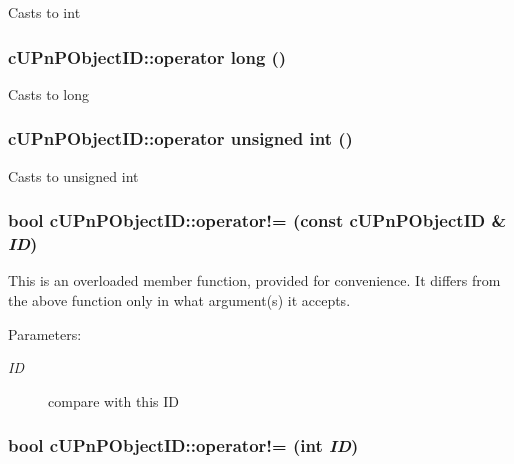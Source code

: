 Casts to int \hypertarget{structcUPnPObjectID_d5659a7a9f7cfc7dd6ae0911ebd5e03c}{
\subsubsection[{operator long}]{\setlength{\rightskip}{0pt plus 5cm}cUPnPObjectID::operator long ()}}
\label{structcUPnPObjectID_d5659a7a9f7cfc7dd6ae0911ebd5e03c}


Casts to long \hypertarget{structcUPnPObjectID_daa4eae524c68f1f85b8d82d16568d10}{
\subsubsection[{operator unsigned int}]{\setlength{\rightskip}{0pt plus 5cm}cUPnPObjectID::operator unsigned int ()}}
\label{structcUPnPObjectID_daa4eae524c68f1f85b8d82d16568d10}


Casts to unsigned int \hypertarget{structcUPnPObjectID_d55b5dc94c58d56762c602de5dd99790}{
\subsubsection[{operator!=}]{\setlength{\rightskip}{0pt plus 5cm}bool cUPnPObjectID::operator!= (const {\bf cUPnPObjectID} \& {\em ID})}}
\label{structcUPnPObjectID_d55b5dc94c58d56762c602de5dd99790}


This is an overloaded member function, provided for convenience. It differs from the above function only in what argument(s) it accepts. \begin{Desc}
\item[Parameters:]
\begin{description}
\item[{\em ID}]compare with this ID \end{description}
\end{Desc}
\hypertarget{structcUPnPObjectID_5183bfe859555d90c7bc7abd576d0980}{
\subsubsection[{operator!=}]{\setlength{\rightskip}{0pt plus 5cm}bool cUPnPObjectID::operator!= (int {\em ID})}}
\label{structcUPnPObjectID_5183bfe859555d90c7bc7abd576d0980}


